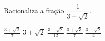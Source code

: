 Racionaliza a fração $\dfrac{1}{3-\sqrt{2}}$.

$\frac{3+\sqrt{2}}{7}$
$3+\sqrt{2}$
$\frac{3-\sqrt{2}}{12}$
$\frac{3+\sqrt{3}}{7}$
$\frac{3-\sqrt{2}}{4}$




